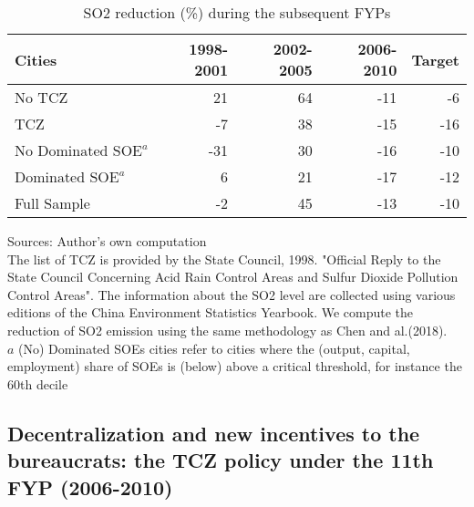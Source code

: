 \documentclass[12pt]{article}
\begin{document}
\begin{table}[!htb] \centering
\caption{\\ SO2 reduction (\%) during the subsequent FYPs}
\label{table_1}
\begin{adjustbox}{width=\textwidth, totalheight=\baselineskip,keepaspectratio}
\begin{tabular}{lrrrr}
\toprule
             Cities &  1998-2001 &  2002-2005 &  2006-2010 &  Target \\
\midrule
             No TCZ &     21 &     64 &    -11 &  -6 \\
                TCZ &     -7 &     38 &    -15 & -16 \\
 $\text{No Dominated SOE}^ a$ &    -31 &     30 &    -16 & -10 \\
 $\text{Dominated SOE}^ a$ &      6 &     21 &    -17 & -12 \\
        Full Sample &     -2 &     45 &    -13 & -10 \\
        
\bottomrule
\end{tabular}
\end{adjustbox}
\begin{tablenotes} 
 \small 
 \item 
Sources: Author's own computation \\
The list of TCZ is provided by the State Council, 1998.
"Official Reply to the State Council Concerning Acid Rain Control Areas
and Sulfur Dioxide Pollution Control Areas".
The information about the SO2 level are collected using various editions
of the China Environment Statistics Yearbook.
We compute the reduction of SO2 emission using the same methodology
as Chen and al.(2018). \\
$a$ (No) Dominated SOEs cities refer to cities where the 
(output, capital, employment) share of SOEs is (below) above a critical threshold, for instance the 60th decile
 
\end{tablenotes}
\end{table}

\subsection{Decentralization and new incentives to the bureaucrats: the TCZ policy under the 11th FYP (2006-2010)}
\end{document}
